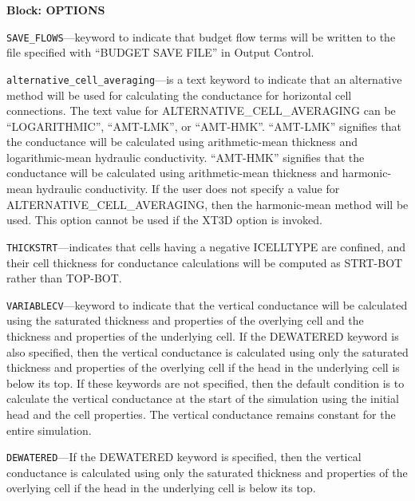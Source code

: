 
\item \textbf{Block: OPTIONS}

\begin{description}
\item \texttt{SAVE\_FLOWS}---keyword to indicate that budget flow terms will be written to the file specified with ``BUDGET SAVE FILE'' in Output Control.

\item \texttt{alternative\_cell\_averaging}---is a text keyword to indicate that an alternative method will be used for calculating the conductance for horizontal cell connections.  The text value for ALTERNATIVE\_CELL\_AVERAGING can be ``LOGARITHMIC'', ``AMT-LMK'', or ``AMT-HMK''.  ``AMT-LMK'' signifies that the conductance will be calculated using arithmetic-mean thickness and logarithmic-mean hydraulic conductivity.  ``AMT-HMK'' signifies that the conductance will be calculated using arithmetic-mean thickness and harmonic-mean hydraulic conductivity. If the user does not specify a value for ALTERNATIVE\_CELL\_AVERAGING, then the harmonic-mean method will be used.  This option cannot be used if the XT3D option is invoked.

\item \texttt{THICKSTRT}---indicates that cells having a negative ICELLTYPE are confined, and their cell thickness for conductance calculations will be computed as STRT-BOT rather than TOP-BOT.

\item \texttt{VARIABLECV}---keyword to indicate that the vertical conductance will be calculated using the saturated thickness and properties of the overlying cell and the thickness and properties of the underlying cell.  If the DEWATERED keyword is also specified, then the vertical conductance is calculated using only the saturated thickness and properties of the overlying cell if the head in the underlying cell is below its top.  If these keywords are not specified, then the default condition is to calculate the vertical conductance at the start of the simulation using the initial head and the cell properties.  The vertical conductance remains constant for the entire simulation.

\item \texttt{DEWATERED}---If the DEWATERED keyword is specified, then the vertical conductance is calculated using only the saturated thickness and properties of the overlying cell if the head in the underlying cell is below its top.


\end{description}

